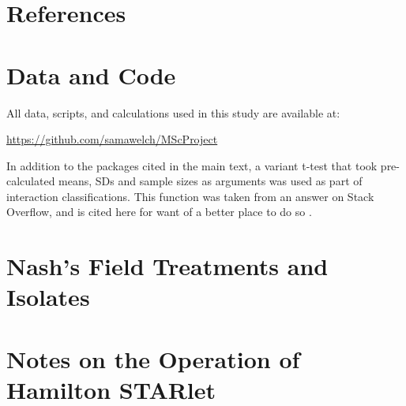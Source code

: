 \documentclass[final,1p,times]{elsarticle}
\begin{document}
\section{References}
\label{S:7}


\begin{appendices}

\section{Data and Code}
\label{A:1}

All data, scripts, and calculations used in this study are available at: 

\url{https://github.com/samawelch/MScProject}

In addition to the packages cited in the main text, a variant t-test that took pre-calculated means, SDs and sample sizes as arguments was used as part of interaction classifications. This function was taken from an answer on Stack Overflow, and is cited here for want of a better place to do so \cite{Macro2012}.

\section{Nash's Field Treatments and Isolates}
\label{A:2}


\section{Notes on the Operation of Hamilton STARlet}
\label{A:3}
\end{appendices}
\end{document}
